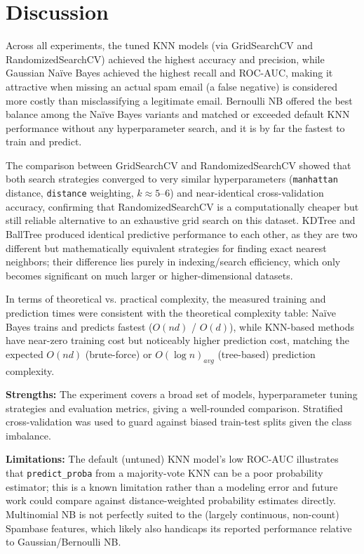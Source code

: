 \documentclass[12pt,a4paper]{article}
\begin{document}
\section{Discussion}
Across all experiments, the tuned KNN models (via GridSearchCV and RandomizedSearchCV) achieved the highest accuracy and precision, while Gaussian Na\"ive Bayes achieved the highest recall and ROC-AUC, making it attractive when missing an actual spam email (a false negative) is considered more costly than misclassifying a legitimate email. Bernoulli NB offered the best balance among the Na\"ive Bayes variants and matched or exceeded default KNN performance without any hyperparameter search, and it is by far the fastest to train and predict.

The comparison between GridSearchCV and RandomizedSearchCV showed that both search strategies converged to very similar hyperparameters (\texttt{manhattan} distance, \texttt{distance} weighting, $k \approx 5$--$6$) and near-identical cross-validation accuracy, confirming that RandomizedSearchCV is a computationally cheaper but still reliable alternative to an exhaustive grid search on this dataset. KDTree and BallTree produced identical predictive performance to each other, as they are two different but mathematically equivalent strategies for finding exact nearest neighbors; their difference lies purely in indexing/search efficiency, which only becomes significant on much larger or higher-dimensional datasets.

In terms of theoretical vs. practical complexity, the measured training and prediction times were consistent with the theoretical complexity table: Na\"ive Bayes trains and predicts fastest ($O(nd)$ / $O(d)$), while KNN-based methods have near-zero training cost but noticeably higher prediction cost, matching the expected $O(nd)$ (brute-force) or $O(\log n)_{avg}$ (tree-based) prediction complexity.

\textbf{Strengths:} The experiment covers a broad set of models, hyperparameter tuning strategies and evaluation metrics, giving a well-rounded comparison. Stratified cross-validation was used to guard against biased train-test splits given the class imbalance.

\textbf{Limitations:} The default (untuned) KNN model's low ROC-AUC illustrates that \texttt{predict\_proba} from a majority-vote KNN can be a poor probability estimator; this is a known limitation rather than a modeling error and future work could compare against distance-weighted probability estimates directly. Multinomial NB is not perfectly suited to the (largely continuous, non-count) Spambase features, which likely also handicaps its reported performance relative to Gaussian/Bernoulli NB.
\end{document}
